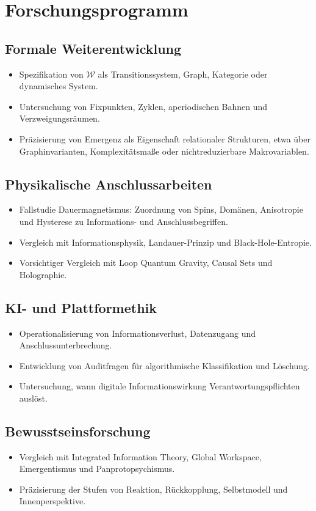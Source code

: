 \documentclass[11pt,a4paper]{article}
\theoremstyle{remark}
\newcommand{\W}{\mathcal{W}}
\begin{document}
\section{Forschungsprogramm}

\subsection{Formale Weiterentwicklung}
\begin{itemize}
    \item Spezifikation von $\W$ als Transitionssystem, Graph, Kategorie oder dynamisches System.
    \item Untersuchung von Fixpunkten, Zyklen, aperiodischen Bahnen und Verzweigungsräumen.
    \item Präzisierung von Emergenz als Eigenschaft relationaler Strukturen, etwa über Graphinvarianten, Komplexitätsmaße oder nichtreduzierbare Makrovariablen.
\end{itemize}

\subsection{Physikalische Anschlussarbeiten}
\begin{itemize}
    \item Fallstudie Dauermagnetismus: Zuordnung von Spins, Domänen, Anisotropie und Hysterese zu Informations- und Anschlussbegriffen.
    \item Vergleich mit Informationsphysik, Landauer-Prinzip und Black-Hole-Entropie.
    \item Vorsichtiger Vergleich mit Loop Quantum Gravity, Causal Sets und Holographie.
\end{itemize}

\subsection{KI- und Plattformethik}
\begin{itemize}
    \item Operationalisierung von Informationsverlust, Datenzugang und Anschlussunterbrechung.
    \item Entwicklung von Auditfragen für algorithmische Klassifikation und Löschung.
    \item Untersuchung, wann digitale Informationswirkung Verantwortungspflichten auslöst.
\end{itemize}

\subsection{Bewusstseinsforschung}
\begin{itemize}
    \item Vergleich mit Integrated Information Theory, Global Workspace, Emergentismus und Panprotopsychismus.
    \item Präzisierung der Stufen von Reaktion, Rückkopplung, Selbstmodell und Innenperspektive.
\end{itemize}
\end{document}

